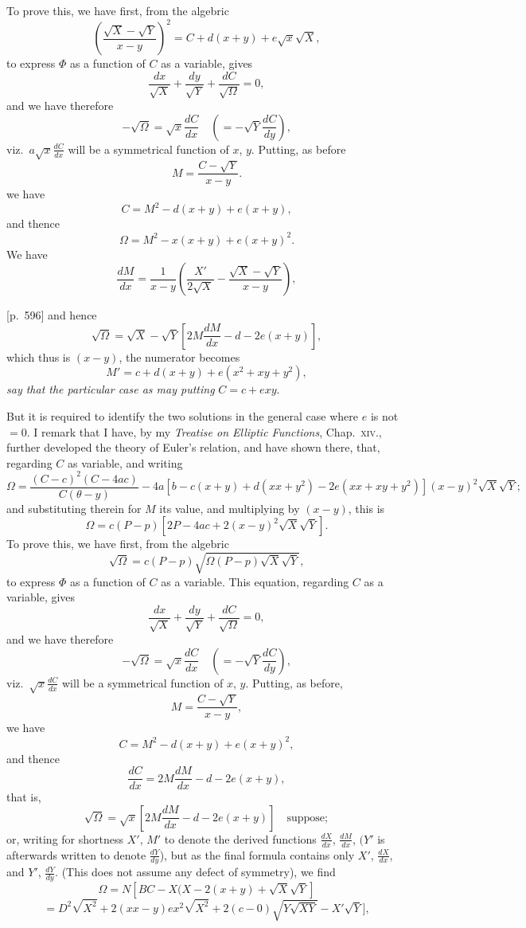\documentclass[11pt,a4paper]{book}
\begin{document}
To prove this, we have first, from the algebric
\[
\left( \frac{\sqrt{X} - \sqrt{Y}}{x - y} \right)^2 = C + d(x + y) + e\sqrt{x}\sqrt{X},
\]
to express $\Phi$ as a function of $C$ as a variable, gives
\[
\frac{dx}{\sqrt{X}} + \frac{dy}{\sqrt{Y}} + \frac{dC}{\sqrt{\Omega}} = 0,
\]
and we have therefore
\[
-\sqrt{\Omega} = \sqrt{x} \frac{dC}{dx} \quad (= -\sqrt{Y} \frac{dC}{dy}),
\]
viz.\ $a\sqrt{x} \frac{dC}{dx}$ will be a symmetrical function of $x$, $y$. Putting, as before
\[
M = \frac{C - \sqrt{Y}}{x - y}.
\]
we have
\[
C = M^2 - d(x + y) + e(x + y),
\]
and thence
\[
\Omega = M^2 - x(x + y) + e(x + y)^2.
\]
We have
\[
\frac{dM}{dx} = \frac{1}{x - y} \left( \frac{X'}{2\sqrt{X}} - \frac{\sqrt{X} - \sqrt{Y}}{x - y} \right),
\]

\bigskip

[p.~596] and hence
\[
\sqrt{\Omega} = \sqrt{X} - \sqrt{Y} \left[ 2M \frac{dM}{dx} - d - 2e(x + y) \right],
\]
which thus is $(x - y)$, the numerator becomes
\[
M' = c + d(x + y) + e(x^2 + xy + y^2),
\]
\textit{say that the particular case as may putting} $C = c + e xy$.

But it is required to identify the two solutions in the general case where $e$ is not $= 0$. I remark that I have, by my \textit{Treatise on Elliptic Functions}, Chap.\ \textsc{xiv}., further developed the theory of Euler's relation, and have shown there, that, regarding $C$ as variable, and writing
\[
\Omega = \frac{(C - c)^2(C - 4ac)}{C(\theta - y)} - 4a \left[ b - c(x + y) + d(x x + y^2) - 2e(x x + x y + y^2) \right] (x - y)^2 \sqrt{X} \sqrt{Y};
\]
and substituting therein for $M$ its value, and multiplying by $(x - y)$, this is
\[
\Omega = c(P - p) [ 2 P - 4ac + 2(x - y)^2 \sqrt{X}\sqrt{Y}].
\]
To prove this, we have first, from the algebric
\[
\sqrt{\Omega} = c(P - p) \sqrt{ \Omega(P - p) \sqrt{X} \sqrt{Y} },
\]
to express $\Phi$ as a function of $C$ as a variable. This equation, regarding $C$ as a variable, gives
\[
\frac{dx}{\sqrt{X}} + \frac{dy}{\sqrt{Y}} + \frac{dC}{\sqrt{\Omega}} = 0,
\]
and we have therefore
\[
-\sqrt{\Omega} = \sqrt{x} \frac{dC}{dx} \quad (= -\sqrt{Y} \frac{dC}{dy}),
\]
viz.\ $\sqrt{x}\frac{dC}{dx}$ will be a symmetrical function of $x$, $y$. Putting, as before,
\[
M = \frac{C - \sqrt{Y}}{x - y},
\]
we have
\[
C = M^2 - d(x + y) + e(x + y)^2,
\]
and thence
\[
\frac{dC}{dx} = 2M \frac{dM}{dx} - d - 2e(x + y),
\]
that is,
\[
\sqrt{\Omega} = \sqrt{x} \left[ 2M \frac{dM}{dx} - d - 2e(x + y) \right] \quad \text{suppose};
\]
or, writing for shortness $X'$, $M'$ to denote the derived functions $\frac{dX}{dx}$, $\frac{dM}{dx}$, $(Y'$ is afterwards written to denote $\frac{dY}{dy}$), but as the final formula contains only $X'$, $\frac{dX}{dx}$, and $Y'$, $\frac{dY}{dy}$. (This does not assume any defect of symmetry), we find
\[
\Omega = N \left[ BC - X(X - 2(x + y) + \sqrt{X} \sqrt{Y} \right]
\]
\[
= D^2 \sqrt{X^2} + 2(xx - y)e x^2 \sqrt{X^2} + 2(c - 0)\sqrt{Y \sqrt{XY}} - X'\sqrt{Y}],
\]
\end{document}
